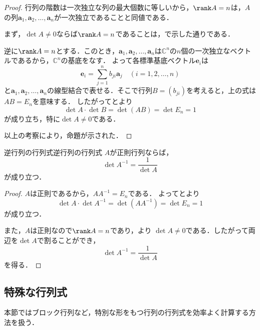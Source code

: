 \begin{tleftbar}
\begin{proof}
  行列の階数は一次独立な列の最大個数に等しいから，$\rank A = n$は，$A$の列$\bm{a}_1, \bm{a}_2, \dots, \bm{a}_n$が一次独立であることと同値である．

  まず，$\det A \ne 0$ならば$\rank A = n$であることは，で示した通りである．

  逆に$\rank A = n$とする．このとき，$\bm{a}_1, \bm{a}_2, \dots, \bm{a}_n$は$\mathbb{C}^n$の$n$個の一次独立なベクトルであるから，$\mathbb{C}^n$の基底をなす．
  よって各標準基底ベクトル$\bm{e}_i$は
  \[
  \bm{e}_i = \sum_{j=1}^{n} b_{ji} \bm{a}_j \quad (i = 1, 2, \dots, n)
  \]
  と$\bm{a}_1, \bm{a}_2, \dots, \bm{a}_n$の線型結合で表せる．そこで行列$B = (b_{ji})$を考えると，上の式は$AB = E_n$を意味する．
  したがってとより
  \[
  \det A \cdot \det B = \det(AB) = \det E_n = 1
  \]
  が成り立ち，特に$\det A \ne 0$である．

  以上の考察により，命題が示された．
\end{proof}
\end{tleftbar}

\begin{cor}{逆行列の行列式}{逆行列の行列式}
  $A$が正則行列ならば，
  \[
    \det A^{-1} = \frac{1}{\det A}
  \]
  が成り立つ．
\end{cor}

\begin{tleftbar}
\begin{proof}
  $A$は正則であるから，$AA^{-1}=E_n$である．
  よってとより
  \[
    \det A \cdot \det A^{-1}
    = \det(AA^{-1})
    = \det E_n
    = 1
  \]
  が成り立つ．

  また，$A$は正則なので$\rank A=n$であり，より
  $\det A \ne 0$である．したがって両辺を$\det A$で割ることができ，
  \[
    \det A^{-1} = \frac{1}{\det A}
  \]
  を得る．
\end{proof}
\end{tleftbar}

\subsection{特殊な行列式}


本節ではブロック行列など，特別な形をもつ行列の行列式を効率よく計算する方法を扱う．


